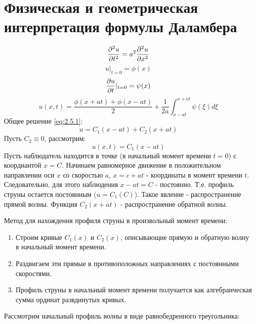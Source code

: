 \documentclass[../main.tex]{subfiles}
\begin{document}
\section{Физическая и геометрическая интерпретация формулы Даламбера}
\begin{equation}
    \label{eq:2.5.1}
    \frac{\partial ^2u}{\partial t^2}=a^2\frac{\partial ^2u}{\partial x^2}
\end{equation}
\begin{equation}
     u|_{t=0} = \phi(x)
\end{equation}
\begin{equation}
    \frac{\partial u}{\partial t}|_{t=0} = \psi(x)
\end{equation}
\begin{equation}
    u(x, t) = \frac{\phi(x + at) + \phi(x - at)}{2} + \frac{1}{2a}\int_{x-at}^{x+at}\psi(\xi)d\xi
\end{equation}
Общее решение \eqref{eq:2.5.1}:
$$
    u = C_1(x-at) + C_2(x+at)
$$
Пусть $C_2 \equiv 0$, рассмотрим:
$$
    u(x, t) = C_1(x - at)
$$
Пусть наблюдатель находится в точке (в начальный момент времени $t = 0$) с коордиантой $x = C$. Начинаем равномерное движение в положительном направлении оси $x$ со скоростью $a$,
$ x = c + at$ - координаты в момент времени $t$. Следовательно, для этого наблюдения $x - at = C$ - постоянно. Т.е. профиль струны остается постоянным ($u = C_1(C)$).
Такое явление - распространение прямой волны. Функция $C_2(x + at)$ - распространение обратной волны.

Метод для нахождения профиля струны в произвольный момент времени:
\begin{enumerate}
    \item Строим кривые $C_1(x)$ и $C_2(x)$, описывающие прямую и обратную волну в начальный момент времени.
    \item Раздвигаем эти прямые в противоположных направлениях с постоянными скоростями. 
    \item Профиль струны в начальный момент времени получается как алгебраическая сумма ординат развдинутых кривых.
\end{enumerate}
Рассмотрим начальный профиль волны в виде равнобедренного треугольника:
\end{document}
